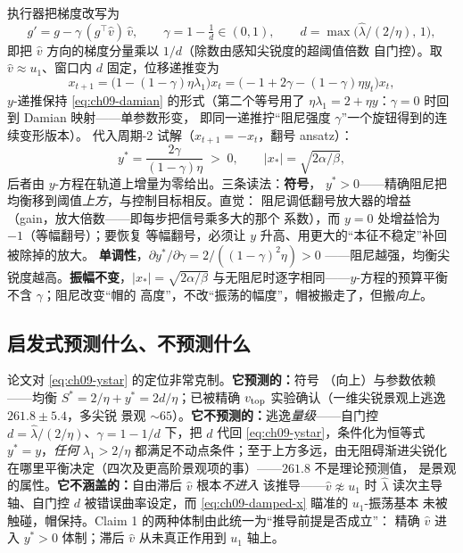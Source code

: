 执行器把梯度改写为
\begin{equation}
  g' = g-\gamma\,(g^{\!\top}\hat v)\,\hat v,
  \qquad
  \gamma=1-\tfrac{1}{d}\in(0,1),
  \qquad
  d=\max\!\bigl(\hat\lambda/(2/\eta),\,1\bigr),
  \label{eq:ch09-edit}
\end{equation}
即把 $\hat v$ 方向的梯度分量乘以 $1/d$（除数由感知尖锐度的超阈值倍数
自门控）。取 $\hat v\approx u_1$、窗口内 $d$ 固定，位移递推变为
\begin{equation}
  x_{t+1}=\bigl(1-(1-\gamma)\eta\lambda_1\bigr)x_t
         =\bigl(-1+2\gamma-(1-\gamma)\eta y_t\bigr)x_t,
  \label{eq:ch09-damped-x}
\end{equation}
$y$-递推保持 \eqref{eq:ch09-damian} 的形式（第二个等号用了
$\eta\lambda_1=2+\eta y$：$\gamma=0$ 时回到 Damian 映射——单参数形变，
即同一递推拧“阻尼强度 $\gamma$”一个旋钮得到的连续变形版本）。
代入周期-2 试解（$x_{t+1}=-x_t$，翻号 ansatz）：
\begin{equation}
  y^{*}=\frac{2\gamma}{(1-\gamma)\eta}\;>\;0,
  \qquad
  |x_*|=\sqrt{2\alpha/\beta},
  \label{eq:ch09-ystar}
\end{equation}
后者由 $y$-方程在轨道上增量为零给出。三条读法：\textbf{符号}，
$y^{*}>0$——精确阻尼把均衡移到阈值\emph{上方}，与控制目标相反。直觉：
阻尼调低翻号放大器的增益（gain，放大倍数——即每步把信号乘多大的那个
系数），而 $y=0$ 处增益恰为 $-1$（等幅翻号）；要恢复
等幅翻号，必须让 $y$ 升高、用更大的“本征不稳定”补回被除掉的放大。
\textbf{单调性}，$\partial y^{*}/\partial\gamma=2/((1-\gamma)^2\eta)>0$
——阻尼越强，均衡尖锐度越高。\textbf{振幅不变}，$|x_*|=\sqrt{2\alpha/\beta}$
与无阻尼时逐字相同——$y$-方程的预算平衡不含 $\gamma$；阻尼改变“帽的
高度”，不改“振荡的幅度”，帽被搬走了，但搬\emph{向上}。

\subsection{启发式预测什么、不预测什么}\label{sec:ch09-heuristic}

论文对 \eqref{eq:ch09-ystar} 的定位非常克制。\textbf{它预测的：}符号
（向上）与参数依赖——均衡 $S^{*}=2/\eta+y^{*}=2d/\eta$；已被精确
$v_{\mathrm{top}}$ 实验确认（一维尖锐景观上逃逸 $261.8\pm5.4$，多尖锐
景观 ${\sim}65$）。\textbf{它不预测的：}逃逸\emph{量级}——自门控
$d=\hat\lambda/(2/\eta)$、$\gamma=1-1/d$ 下，把 $d$ 代回
\eqref{eq:ch09-ystar}，条件化为恒等式 $y^{*}=y$，\emph{任何}
$\lambda_1>2/\eta$ 都满足不动点条件；至于上方多远，由无阻碍渐进尖锐化
在哪里平衡决定（四次及更高阶景观项的事）——$261.8$ 不是理论预测值，
是景观的属性。\textbf{它不涵盖的：}自由滞后 $\hat v$ 根本\emph{不进入}
该推导——$\hat v\not\approx u_1$ 时 $\hat\lambda$ 读次主导轴、自门控
$d$ 被错误曲率设定，而 \eqref{eq:ch09-damped-x} 瞄准的 $u_1$-振荡基本
未被触碰，帽保持。Claim 1 的两种体制由此统一为“推导前提是否成立”：
精确 $\hat v$ 进入 $y^{*}>0$ 体制；滞后 $\hat v$ 从未真正作用到 $u_1$
轴上。

